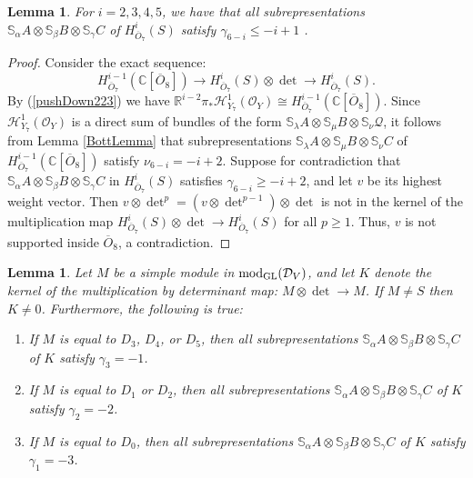 \documentclass[11pt,reqno]{amsart}
\newcommand{\D}{\mathcal{D}}
\newcommand{\oo}{\otimes}
\newcommand{\bS}{\mathbb{S}}
\newcommand{\tn}{\textnormal}
\newcommand{\C}{\mathbb{C}}
\newcommand{\GL}{\operatorname{GL}}
\renewcommand{\det}{\operatorname{det}}
\newcommand{\mc}[1]{\mathcal{#1}}
\newcommand{\ol}[1]{\overline{#1}}
\newtheorem{lemma}[theorem]{Lemma}
\numberwithin{equation}{section}
\begin{document}
\begin{lemma}\label{lem:upperBoundsOnWeights}
For $i=2,3,4,5$, we have that all subrepresentations $\bS_{\alpha}A\oo \bS_{\beta}B\oo \bS_{\gamma}C$ of $H^i_{\ol{O}_7}(S)$ satisfy $\gamma_{6-i}\leq -i+1$	.
\end{lemma}

\begin{proof}
Consider the exact sequence:
$$
H^{i-1}_{\ol{O}_7}(\C[\ol{O}_8])\to H^i_{\ol{O}_7}(S)\otimes \det \to H^i_{\ol{O}_7}(S).
$$
By (\ref{pushDown223}) we have $\mathbb{R}^{i-2}\pi_{\ast}\mathscr{H}^1_{Y_7}(\mc{O}_Y)\cong H^{i-1}_{\ol{O}_7}(\C[\ol{O}_8])$. Since $\mathscr{H}^1_{Y_7}(\mc{O}_Y)$ is a direct sum of bundles of the form $\bS_{\lambda}A\oo \bS_{\mu}B\oo \bS_{\nu}\mc{Q}$, it follows from  Lemma \ref{BottLemma} that subrepresentations $\bS_{\lambda}A\oo \bS_{\mu}B\oo \bS_{\nu}C$ of $H^{i-1}_{\ol{O}_7}(\C[\ol{O}_8])$ satisfy $\nu_{6-i}=-i+2$. Suppose for contradiction that $\bS_{\alpha}A\oo \bS_{\beta}B\oo \bS_{\gamma}C$ in $H^i_{\ol{O}_7}(S)$ satisfies $\gamma_{6-i}\geq-i+2$, and let $v$ be its highest weight vector. Then $v\otimes \det^p=(v\oo \det^{p-1})\oo \det$ is not in the kernel of the multiplication map $H^i_{\ol{O}_7}(S)\otimes \det \to H^i_{\ol{O}_7}(S)$ for all $p\geq 1$. Thus, $v$ is not supported inside $\ol{O}_8$, a contradiction.
\end{proof}




\begin{lemma}\label{lem:kerCharlemma}
Let $M$ be a simple module in $\tn{mod}_{\GL}(\D_V)$, and let $K$ denote the kernel of the multiplication by determinant map: $M\otimes \det \to M$. If $M\neq S$ then $K\neq 0$. Furthermore, the following is true:
\begin{enumerate}
\item If $M$ is equal to $D_3$, $D_4$, or $D_5$, then all subrepresentations $\bS_{\alpha}A\oo \bS_{\beta}B\oo \bS_{\gamma}C$ of $K$ satisfy $\gamma_3=-1$.
\item If $M$ is equal to $D_1$ or $D_2$, then all subrepresentations $\bS_{\alpha}A\oo \bS_{\beta}B\oo \bS_{\gamma}C$ of $K$ satisfy $\gamma_2=-2$.
\item If $M$ is equal to $D_0$, then all subrepresentations $\bS_{\alpha}A\oo \bS_{\beta}B\oo \bS_{\gamma}C$ of $K$ satisfy $\gamma_1=-3$. 

\end{enumerate}
\end{lemma}
\end{document}
